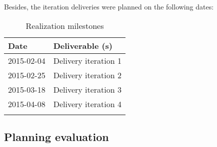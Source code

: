 %
Besides, the iteration deliveries were planned on the following dates:
\begin{longtable}{|l|l|}\hline
    \textbf{Date} & \textbf{Deliverable (s)} \\\hline
	\endhead
    2015-02-04 & Delivery iteration 1\\\hline
    2015-02-25 & Delivery iteration 2\\\hline
    2015-03-18 & Delivery iteration 3\\\hline
    2015-04-08 & Delivery iteration 4\\\hline
  \caption{Realization milestones}
  \label{tab:realization-milestones}
\end{longtable}


\subsection{Planning evaluation}
\lipsum[1]

